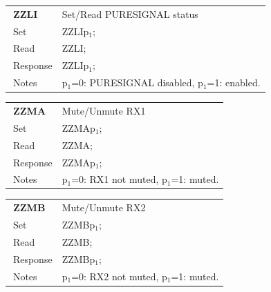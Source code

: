\documentclass[12pt]{book}
\begin{document}
\begin{center}
\begin{tabular}{|p{2cm}|p{11cm}|}
\toprule
$\phantom{\Big|}$\textbf{\large ZZLI} & Set/Read PURESIGNAL status \\\cline{1-2}
$\phantom{\Big|}${\large Set} & {ZZLIp$_1$;} \\\hline
$\phantom{\Big|}${\large Read} & {ZZLI;} \\\hline
$\phantom{\Big|}${\large Response} & {ZZLIp$_1$;} \\\hline
$\phantom{\Big|}${\large Notes} & \multicolumn{1}{|p{11cm}|}{p$_1$=0: PURESIGNAL disabled, p$_1$=1: enabled.} \\
\bottomrule
\end{tabular}
\end{center}

\begin{center}
\begin{tabular}{|p{2cm}|p{11cm}|}
\toprule
$\phantom{\Big|}$\textbf{\large ZZMA} & Mute/Unmute RX1 \\\cline{1-2}
$\phantom{\Big|}${\large Set} & {ZZMAp$_1$;} \\\hline
$\phantom{\Big|}${\large Read} & {ZZMA;} \\\hline
$\phantom{\Big|}${\large Response} & {ZZMAp$_1$;} \\\hline
$\phantom{\Big|}${\large Notes} & \multicolumn{1}{|p{11cm}|}{p$_1$=0: RX1 not muted, p$_1$=1: muted.} \\
\bottomrule
\end{tabular}
\end{center}

\begin{center}
\begin{tabular}{|p{2cm}|p{11cm}|}
\toprule
$\phantom{\Big|}$\textbf{\large ZZMB} & Mute/Unmute RX2 \\\cline{1-2}
$\phantom{\Big|}${\large Set} & {ZZMBp$_1$;} \\\hline
$\phantom{\Big|}${\large Read} & {ZZMB;} \\\hline
$\phantom{\Big|}${\large Response} & {ZZMBp$_1$;} \\\hline
$\phantom{\Big|}${\large Notes} & \multicolumn{1}{|p{11cm}|}{p$_1$=0: RX2 not muted, p$_1$=1: muted.} \\
\bottomrule
\end{tabular}
\end{center}
\end{document}
